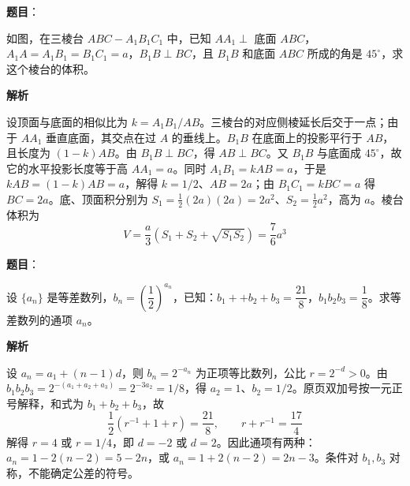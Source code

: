 \begin{answer}

\textbf{题目}：

如图，在三棱台 $ABC-A_1B_1C_1$ 中，已知 $AA_1\perp$ 底面 $ABC$，$A_1A=A_1B_1=B_1C_1=a$，$B_1B\perp BC$，且 $B_1B$ 和底面 $ABC$ 所成的角是 $45^\circ$，求这个棱台的体积。
\nopagebreak[4]
\begin{center}\end{center}
\nopagebreak[4]
\textbf{解析}

设顶面与底面的相似比为 $k=A_1B_1/AB$。三棱台的对应侧棱延长后交于一点；由于 $AA_1$ 垂直底面，其交点在过 $A$ 的垂线上。$B_1B$ 在底面上的投影平行于 $AB$，且长度为 $(1-k)AB$。由 $B_1B\perp BC$，得 $AB\perp BC$。又 $B_1B$ 与底面成 $45^\circ$，故它的水平投影长度等于高 $AA_1=a$。同时 $A_1B_1=kAB=a$，于是 $kAB=(1-k)AB=a$，解得 $k=1/2$、$AB=2a$；由 $B_1C_1=kBC=a$ 得 $BC=2a$。底、顶面积分别为 $S_1=\tfrac12(2a)(2a)=2a^2$、$S_2=\tfrac12a^2$，高为 $a$。棱台体积为
\nopagebreak[4]
\[
V=\frac a3\left(S_1+S_2+\sqrt{S_1S_2}\right)=\frac76a^3
\]


\end{answer}
\begin{answer}

\textbf{题目}：

设 $\{a_n\}$ 是等差数列，$b_n=\left(\dfrac12\right)^{a_n}$，已知：$b_1 + +b_2+b_3=\dfrac{21}{8}$，$b_1b_2b_3=\dfrac18$。求等差数列的通项 $a_n$。

\textbf{解析}

设 $a_n=a_1+(n-1)d$，则 $b_n=2^{-a_n}$ 为正项等比数列，公比 $r=2^{-d}>0$。由 $b_1b_2b_3=2^{-(a_1+a_2+a_3)}=2^{-3a_2}=1/8$，得 $a_2=1$、$b_2=1/2$。原页双加号按一元正号解释，和式为 $b_1+b_2+b_3$，故
\nopagebreak[4]
\[
\frac12\left(r^{-1}+1+r\right)=\frac{21}{8},\qquad r+r^{-1}=\frac{17}{4}
\]
解得 $r=4$ 或 $r=1/4$，即 $d=-2$ 或 $d=2$。因此通项有两种：$a_n=1-2(n-2)=5-2n$，或 $a_n=1+2(n-2)=2n-3$。条件对 $b_1,b_3$ 对称，不能确定公差的符号。


\end{answer}
